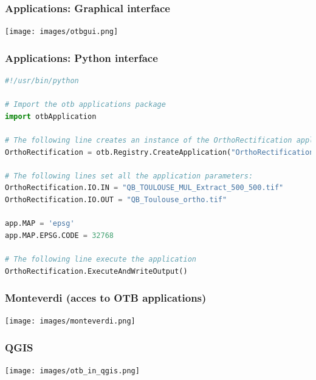 \documentclass[8pt]{beamer}
\begin{document}
\begin{frame}[fragile]
\frametitle{Applications: Graphical interface}
\begin{center}
\texttt{[image: images/otbgui.png]}
\end{center}
\end{frame}

\begin{frame}[fragile]
\frametitle{Applications: Python interface}
\begin{lstlisting}[language=python,breaklines=true,breakatwhitespace=true,frame = tb,framerule = 0.25pt,fontadjust,backgroundcolor={\color{listlightgray}},basicstyle = {\ttfamily\tiny},keywordstyle = {\ttfamily\color{listkeyword}\textbf},identifierstyle = {\ttfamily},commentstyle = {\ttfamily\color{listcomment}\textit},stringstyle = {\ttfamily},showstringspaces = false,showtabs = false,numbers = none,numbersep = 6pt, numberstyle={\ttfamily\color{listnumbers}},tabsize = 2]
#!/usr/bin/python

# Import the otb applications package
import otbApplication

# The following line creates an instance of the OrthoRectification application
OrthoRectification = otb.Registry.CreateApplication("OrthoRectification")

# The following lines set all the application parameters:
OrthoRectification.IO.IN = "QB_TOULOUSE_MUL_Extract_500_500.tif"
OrthoRectification.IO.OUT = "QB_Toulouse_ortho.tif"

app.MAP = 'epsg'
app.MAP.EPSG.CODE = 32768

# The following line execute the application
OrthoRectification.ExecuteAndWriteOutput()
\end{lstlisting}
\end{frame}


\begin{frame}
\frametitle{Monteverdi (acces to OTB applications)}
\begin{minipage}[t][6cm][t]{\textwidth}
\begin{center}
\texttt{[image: images/monteverdi.png]}
\end{center}
\end{minipage}
\end{frame}

\begin{frame}
  \frametitle{QGIS}
\begin{minipage}[t][6cm][t]{\textwidth}
\begin{center}
\texttt{[image: images/otb\_in\_qgis.png]}
\end{center}
\end{minipage}
\end{frame}
\end{document}
